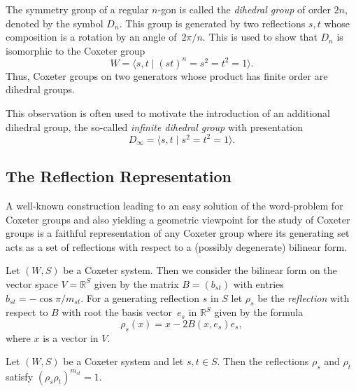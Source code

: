 \documentclass[main.tex]{subfiles}
\begin{document}
\begin{example}
	The symmetry group of a regular $n$-gon is called the 
	\textit{dihedral group} of order $2n$, denoted by the 
	symbol $D_n$. This group is generated by two reflections
	$s, t$ whose composition is a rotation by an angle
	of~$2\pi/n$. This is used to show that $D_n$ 
	is isomorphic to the Coxeter group
		$$W = 
			\langle 
				s, t \; | \; (st)^n = s^2 = t^2 = 1 
			\rangle.$$
		Thus, Coxeter groups on two generators whose product
		has finite order are dihedral groups.

	This observation is often used to motivate the 
	introduction of an additional dihedral group, the so-called
	\textit{infinite dihedral group} with presentation
		$$D_\infty = 
			\langle 
				s, t \; | \; s^2 = t^2 = 1 
			\rangle.$$
\end{example}

\subsection{The Reflection Representation}
A well-known construction leading to an easy solution of the
word-problem for Coxeter groups and also yielding a
geometric viewpoint for the study of Coxeter groups is a faithful
representation of any Coxeter group where its generating set
acts as a set of reflections with respect to a (possibly
degenerate) bilinear form.

Let $(W,S)$ be a Coxeter system. Then we consider the bilinear
form on the vector space $V = \mathbb{R}^S$ given by the matrix
$B = (b_{st})$ with entries $b_{st} = -\cos \pi/m_{st}$. 
For a generating reflection $s$ in $S$ let $\rho_s$ be the
\textit{reflection} with respect to $B$ with root the basis
vector~$e_s$ in $\mathbb{R}^S$ given by the formula
$$ \rho_s(x) = x - 2B(x, e_s)e_s,$$
where $x$ is a vector in $V$.

\begin{proposition}
\label{prop:reflection-representation-well-defined}
Let $(W,S)$ be a Coxeter system and let $s, t \in S$. 
Then the reflections $\rho_s$ and $\rho_t$ satisfy 
$(\rho_s \rho_t)^{m_{st}} = 1$.
\end{proposition}
\end{document}
